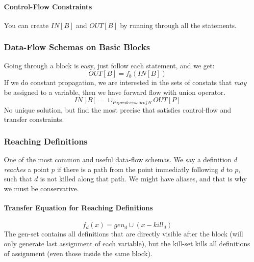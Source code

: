 \documentclass{article}
\begin{document}
\paragraph{Control-Flow Constraints} %
\label{par:Control-Flow Constraints}
You can create $IN[B]$ and $OUT[B]$ by running through all the statements.


\subsubsection{Data-Flow Schemas on Basic Blocks} %
\label{ssub:Data-Flow Schemas on Basic Blocks}
Going through a block is easy, just follow each statement, and we get:
\begin{equation}
	OUT[B] = f_b(IN[B])
\end{equation}
If we do constant propagation, we are interested in the sets of constats that \emph{may} be assigned to a variable, then we have forward flow with union operator.
\begin{equation}
	IN[B] = \cup_{P a predecessor of B}OUT[P]
\end{equation}
No unique solution, but find the most precise that satisfies control-flow and transfer constraints.

\subsubsection{Reaching Definitions} %
\label{ssub:Reaching Definitions}
One of the most common and useful data-flow schemas. We say a definition $d$ \emph{reaches} a point $p$ if there is a path from the point immediatly following $d$ to $p$, such that $d$ is not killed along that path. We might have aliases, and that is why we must be conservative.

\paragraph{Transfer Equation for Reaching Definitions} %
\label{par:Transfer Equation for Reaching Definitions}
\begin{equation}
	f_d(x) = gen_d \cup (x - kill_d)
\end{equation}
The gen-set contains all definitions that are directly visible after the block (will only generate last assignment of each variable), but the kill-set kills all definitions of assignment (even those inside the same block).
\end{document}
